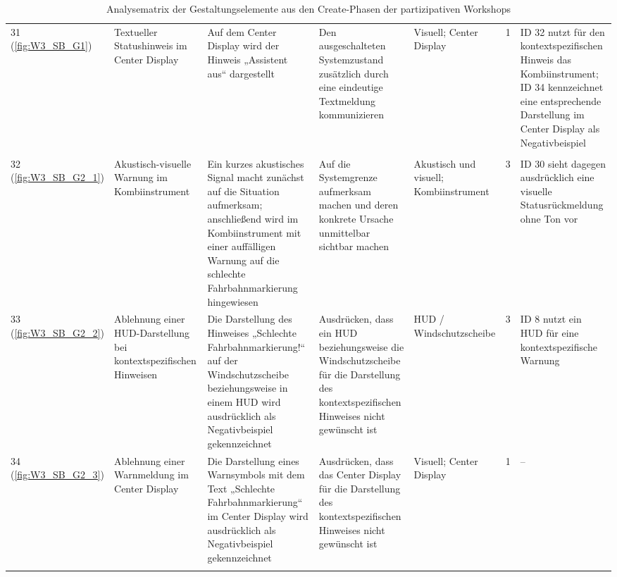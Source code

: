 {\begin{xltabular}{\textwidth}{
    P{0.65cm}
    Y
    Y
    Y
    P{1.75cm}
    P{1.25cm}
    Y
}
\rowrule

31 (\ref{fig:W3_SB_G1}) &
Textueller Statushinweis im Center Display &
Auf dem Center Display wird der Hinweis „Assistent aus“ dargestellt &
Den ausgeschalteten Systemzustand zusätzlich durch eine eindeutige Textmeldung kommunizieren &
Visuell; Center Display &
1 &
ID 32 nutzt für den kontextspezifischen Hinweis das Kombiinstrument; ID 34 kennzeichnet eine entsprechende Darstellung im Center Display als Negativbeispiel
\\

\rowrule
{}
\\
\rowrule

32 (\ref{fig:W3_SB_G2_1}) &
Akustisch-visuelle Warnung im Kombiinstrument &
Ein kurzes akustisches Signal macht zunächst auf die Situation aufmerksam; anschließend wird im Kombiinstrument mit einer auffälligen Warnung auf die schlechte Fahrbahnmarkierung hingewiesen &
Auf die Systemgrenze aufmerksam machen und deren konkrete Ursache unmittelbar sichtbar machen &
Akustisch und visuell; Kombiinstrument &
3 &
ID 30 sieht dagegen ausdrücklich eine visuelle Statusrückmeldung ohne Ton vor
\\

\rowrule

33 (\ref{fig:W3_SB_G2_2}) &
Ablehnung einer HUD-Darstellung bei kontextspezifischen Hinweisen &
Die Darstellung des Hinweises „Schlechte Fahrbahnmarkierung!“ auf der Windschutzscheibe beziehungsweise in einem HUD wird ausdrücklich als Negativbeispiel gekennzeichnet &
Ausdrücken, dass ein HUD beziehungsweise die Windschutzscheibe für die Darstellung des kontextspezifischen Hinweises nicht gewünscht ist &
HUD / Windschutzscheibe &
3 &
ID 8 nutzt ein HUD für eine kontextspezifische Warnung
\\

\rowrule

34 (\ref{fig:W3_SB_G2_3}) &
Ablehnung einer Warnmeldung im Center Display &
Die Darstellung eines Warnsymbols mit dem Text „Schlechte Fahrbahnmarkierung“ im Center Display wird ausdrücklich als Negativbeispiel gekennzeichnet &
Ausdrücken, dass das Center Display für die Darstellung des kontextspezifischen Hinweises nicht gewünscht ist &
Visuell; Center Display &
1 &
--
\\*

\bottomrule

\caption{Analysematrix der Gestaltungselemente aus den Create-Phasen der partizipativen Workshops}
\label{tab:analysematrix_workshops}
\\

\end{xltabular}
}

